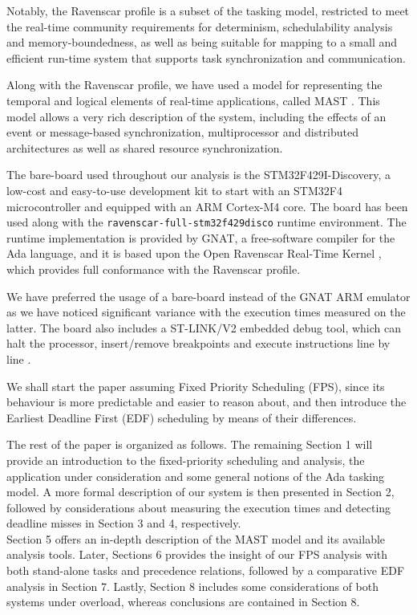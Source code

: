\documentclass{article}
\begin{document}
Notably, the Ravenscar profile \cite{ycs} is a subset of the tasking model, restricted to meet the real-time community requirements for determinism, schedulability analysis and memory-boundedness, as well as being suitable for mapping to a small and efficient run-time system that supports task synchronization and communication.

Along with the Ravenscar profile, we have used a model for representing the temporal and logical elements of real-time applications, called MAST \cite{mast}. This model allows a very rich description of the system, including the effects of an event or message-based synchronization, multiprocessor and distributed architectures as well as shared resource synchronization.

The bare-board used throughout our analysis is the STM32F429I-Discovery, a low-cost and easy-to-use development kit to start with an STM32F4 microcontroller and equipped with an ARM Cortex-M4 core.
The board has been used along with the \texttt{ravenscar-full-stm32f429disco} runtime environment. The runtime implementation is provided by GNAT, a free-software compiler for the Ada language, and it is based upon the Open Ravenscar Real-Time Kernel \cite{ork}, which provides full conformance with the Ravenscar profile.

We have preferred the usage of a bare-board instead of the GNAT ARM emulator as we have noticed significant variance with the execution times measured on the latter. The board also includes a ST-LINK/V2 embedded debug tool, which can halt the processor, insert/remove breakpoints and execute instructions line by line \cite{debug-trace}.

We shall start the paper assuming Fixed Priority Scheduling (FPS), since its behaviour is more predictable and easier to reason about, and then introduce the Earliest Deadline First (EDF) scheduling by means of their differences.

The rest of the paper is organized as follows. The remaining Section 1 will provide an introduction to the fixed-priority scheduling and analysis, the application under consideration and some general notions of the Ada tasking model. A more formal description of our system is then presented in Section 2, followed by considerations about measuring the execution times and detecting deadline misses in Section 3 and 4, respectively. \\
Section 5 offers an in-depth description of the MAST model and its available analysis tools. Later, Sections 6 provides the insight of our FPS analysis with both stand-alone tasks and precedence relations, followed by a comparative EDF analysis in Section 7. Lastly, Section 8 includes some considerations of both systems under overload, whereas conclusions are contained in Section 8.
\end{document}
